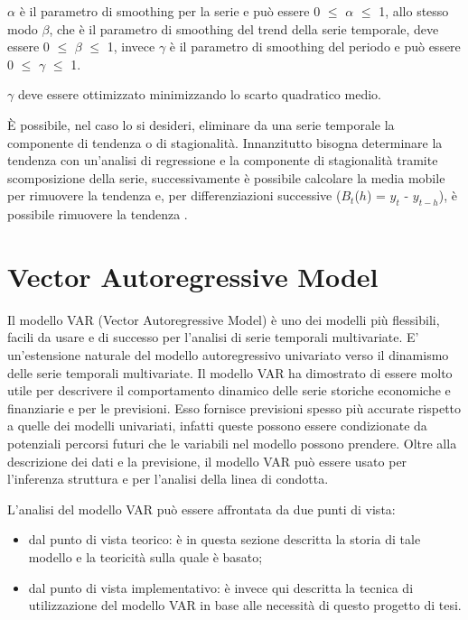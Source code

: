 \documentclass[12pt,a4paper,twoside,openright]{book}
\begin{document}
$\alpha$ è il parametro di smoothing per la serie e può essere 0 $\leq$ $\alpha$ $\leq$ 1, allo stesso modo $\beta$, che è il parametro di smoothing del trend della serie temporale, deve essere 0 $\leq$ $\beta$ $\leq$ 1, invece $\gamma$ è il parametro di smoothing del periodo e può essere 0 $\leq$ $\gamma$ $\leq$ 1. 

$\gamma$ deve essere ottimizzato minimizzando lo scarto quadratico medio.

\medskip \medskip

È possibile, nel caso lo si desideri, eliminare da una serie temporale la componente di tendenza o di stagionalità.
Innanzitutto bisogna determinare la tendenza con un'analisi di regressione e la componente di stagionalità tramite scomposizione della serie, successivamente è possibile calcolare la media mobile per rimuovere la tendenza e, per differenziazioni successive ($B_{t}$($h$) = $y_{t}$ - $y_{t-h}$), è possibile rimuovere la tendenza \cite{8a}.

\newpage
\section{Vector Autoregressive Model}
Il modello VAR (Vector Autoregressive Model) è uno dei modelli  più flessibili, facili da usare e di successo per l'analisi di serie temporali multivariate. E' un'estensione naturale del modello autoregressivo univariato verso il dinamismo delle serie temporali multivariate. Il modello VAR ha dimostrato di essere molto utile per descrivere il comportamento dinamico delle serie storiche economiche e finanziarie e per le previsioni. Esso fornisce previsioni spesso più accurate rispetto a quelle dei modelli univariati, infatti queste possono essere condizionate da potenziali percorsi futuri che le variabili nel modello possono prendere. Oltre alla descrizione dei dati e la previsione, il modello VAR può essere usato per l'inferenza struttura e per l'analisi della linea di condotta. 

L'analisi del modello VAR può essere affrontata da due punti di vista: 
\begin{itemize}
\item dal punto di vista teorico: è in questa sezione descritta la storia di tale modello e la teoricità sulla quale è basato;
\item dal punto di vista implementativo: è invece qui descritta la tecnica di utilizzazione del modello VAR in base alle necessità di questo progetto di tesi.
\end{itemize}
\newpage 
\end{document}
